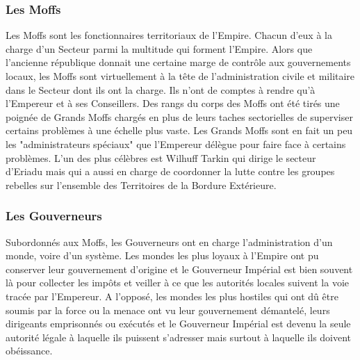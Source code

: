 \documentclass[twoside]{article}
\begin{document}
\subsubsection{Les Moffs}
Les Moffs sont les fonctionnaires territoriaux de l'Empire. Chacun d'eux à la charge d'un Secteur parmi la multitude qui forment l'Empire. Alors que l'ancienne république donnait une certaine marge de contrôle aux gouvernements locaux, les Moffs sont virtuellement à la tête de l'administration civile et militaire dans le Secteur dont ils ont la charge. Ils n'ont de comptes à rendre qu'à l'Empereur et à ses Conseillers.  Des rangs du corps des Moffs ont été tirés une poignée de Grands Moffs chargés en plus de leurs taches sectorielles de superviser certains problèmes à une échelle plus vaste. Les Grands Moffs sont en fait un peu les "administrateurs spéciaux" que l'Empereur délègue pour faire face à certains problèmes. L'un des plus célèbres est Wilhuff Tarkin qui dirige le secteur d'Eriadu mais qui a aussi en charge de coordonner la lutte contre les groupes rebelles sur l'ensemble des Territoires de la Bordure Extérieure.

\subsubsection{Les Gouverneurs}
Subordonnés aux Moffs, les Gouverneurs ont en charge l'administration d'un monde, voire d'un système. Les mondes les plus loyaux à l'Empire ont pu conserver leur gouvernement d'origine et le Gouverneur Impérial est bien souvent là pour collecter les impôts et veiller à ce que les autorités locales suivent la voie tracée par l'Empereur. A l'opposé, les mondes les plus hostiles qui ont dû être soumis par la force ou la menace ont vu leur gouvernement démantelé, leurs dirigeants emprisonnés ou exécutés et le Gouverneur Impérial est devenu la seule autorité légale à laquelle ils puissent s'adresser mais surtout à laquelle ils doivent obéissance.
\end{document}
